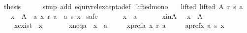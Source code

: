 \begin{isabellebody}
\ {\isacharquery}{\kern0pt}thesis\isanewline
\ \ \ \ \isamarkupfalse%
\ {\isacharparenleft}{\kern0pt}simp\ add{\isacharcolon}{\kern0pt}\ equiv{\isacharunderscore}{\kern0pt}rel{\isacharunderscore}{\kern0pt}except{\isacharunderscore}{\kern0pt}a{\isacharunderscore}{\kern0pt}def{\isacharparenright}{\kern0pt}\isanewline
{}\isamarkupfalse%
%
\endisatagproof
{\isafoldproof}%
%
\isadelimproof
\isanewline
%
\endisadelimproof
\isanewline
{}\isamarkupfalse%
\ lifted{\isacharunderscore}{\kern0pt}mono{\isacharcolon}{\kern0pt}\isanewline
\ \ \ lifted{\isacharcolon}{\kern0pt}\ {\isachardoublequoteopen}lifted\ A\ r\ s\ a{\isachardoublequoteclose}\isanewline
\ \ \ {\isachardoublequoteopen}{\isasymforall}x\ {\isasymin}\ A\ {\isacharminus}{\kern0pt}\ {\isacharbraceleft}{\kern0pt}a{\isacharbraceright}{\kern0pt}{\isachardot}{\kern0pt}\ {\isasymnot}{\isacharparenleft}{\kern0pt}x\ {\isasympreceq}\isactrlsub r\ a\ {\isasymand}\ a\ {\isasympreceq}\isactrlsub s\ x{\isacharparenright}{\kern0pt}{\isachardoublequoteclose}\isanewline
%
\isadelimproof
%
\endisadelimproof
%
\isatagproof
{}\isamarkupfalse%
\ {\isacharparenleft}{\kern0pt}safe{\isacharparenright}{\kern0pt}\isanewline
\ \ \isamarkupfalse%
\isanewline
\ \ \ \ x\ {\isacharcolon}{\kern0pt}{\isacharcolon}{\kern0pt}\ {\isachardoublequoteopen}{\isacharprime}{\kern0pt}a{\isachardoublequoteclose}\isanewline
\ \ \isamarkupfalse%
\isanewline
\ \ \ \ x{\isacharunderscore}{\kern0pt}in{\isacharunderscore}{\kern0pt}A{\isacharcolon}{\kern0pt}\ \ \ {\isachardoublequoteopen}x\ {\isasymin}\ A{\isachardoublequoteclose}\ \isanewline
\ \ \ \ x{\isacharunderscore}{\kern0pt}exist{\isacharcolon}{\kern0pt}\ \ {\isachardoublequoteopen}x\ {\isasymnotin}\ {\isacharbraceleft}{\kern0pt}{\isacharbraceright}{\kern0pt}{\isachardoublequoteclose}\ \isanewline
\ \ \ \ x{\isacharunderscore}{\kern0pt}neq{\isacharunderscore}{\kern0pt}a{\isacharcolon}{\kern0pt}\ \ {\isachardoublequoteopen}x\ {\isasymnoteq}\ a{\isachardoublequoteclose}\ \isanewline
\ \ \ \ x{\isacharunderscore}{\kern0pt}pref{\isacharunderscore}{\kern0pt}a{\isacharcolon}{\kern0pt}\ {\isachardoublequoteopen}x\ {\isasympreceq}\isactrlsub r\ a{\isachardoublequoteclose}\ \isanewline
\ \ \ \ a{\isacharunderscore}{\kern0pt}pref{\isacharunderscore}{\kern0pt}x{\isacharcolon}{\kern0pt}\ {\isachardoublequoteopen}a\ {\isasympreceq}\isactrlsub s\ x{\isachardoublequoteclose}\isanewline
\ \ \isamarkupfalse%

\end{isabellebody}
